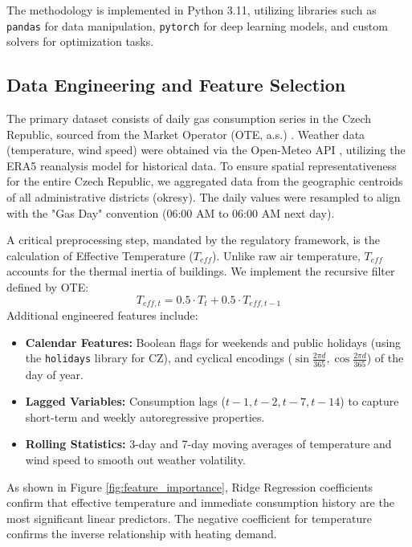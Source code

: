 \documentclass[journal,article,submit,pdftex,moreauthors]{Definitions/mdpi}
\begin{document}
The methodology is implemented in Python 3.11, utilizing libraries such as \texttt{pandas} for data manipulation, \texttt{pytorch} \citep{ref_pytorch} for deep learning models, and custom solvers for optimization tasks.

\subsection{Data Engineering and Feature Selection}
The primary dataset consists of daily gas consumption series in the Czech Republic, sourced from the Market Operator (OTE, a.s.) \citep{ref_ote}. Weather data (temperature, wind speed) were obtained via the Open-Meteo API \citep{ref_openmeteo}, utilizing the ERA5 reanalysis model for historical data. To ensure spatial representativeness for the entire Czech Republic, we aggregated data from the geographic centroids of all administrative districts (okresy). The daily values were resampled to align with the "Gas Day" convention (06:00 AM to 06:00 AM next day).

A critical preprocessing step, mandated by the regulatory framework, is the calculation of Effective Temperature ($T_{eff}$). Unlike raw air temperature, $T_{eff}$ accounts for the thermal inertia of buildings. We implement the recursive filter defined by OTE:
\begin{equation}
    T_{eff, t} = 0.5 \cdot T_t + 0.5 \cdot T_{eff, t-1}
\end{equation}
Additional engineered features include:
\begin{itemize}
    \item \textbf{Calendar Features:} Boolean flags for weekends and public holidays (using the \texttt{holidays} library for CZ), and cyclical encodings ($\sin \frac{2\pi d}{365}, \cos \frac{2\pi d}{365}$) of the day of year.
    \item \textbf{Lagged Variables:} Consumption lags ($t-1, t-2, t-7, t-14$) to capture short-term and weekly autoregressive properties.
    \item \textbf{Rolling Statistics:} 3-day and 7-day moving averages of temperature and wind speed to smooth out weather volatility.
\end{itemize}

As shown in Figure \ref{fig:feature_importance}, Ridge Regression coefficients confirm that effective temperature and immediate consumption history are the most significant linear predictors. The negative coefficient for temperature confirms the inverse relationship with heating demand.
\end{document}

